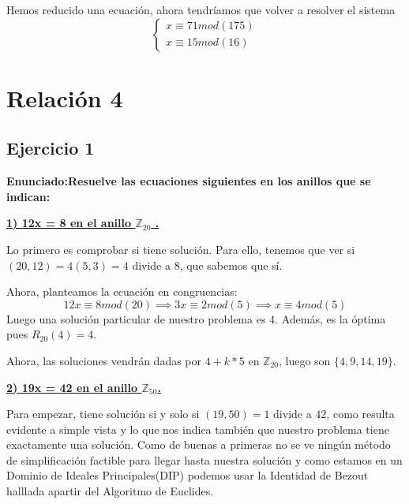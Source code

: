 \documentclass[11pt, a4paper, titlepage]{article}
\providecommand{\ent}{\mathbb{Z}}
\begin{document}
Hemos reducido una ecuación, ahora tendríamos que volver a resolver el sistema
\[
\begin{cases}
	x \equiv 71 mod(175)\\
	x \equiv 15 mod(16)
\end{cases}
\]






\pagebreak
\section{\Huge{Relación 4}}



\subsection{ \LARGE{Ejercicio 1}}

\textbf{Enunciado:Resuelve las ecuaciones siguientes en los anillos que se indican:}

\underline{\textbf{1) 12x = 8 en el anillo $\ent_{20}$ .}}

Lo primero es comprobar si tiene solución. Para ello, tenemos que ver si $(20,12) = 4(5,3) = 4$ divide a 8, que sabemos que sí.

Ahora, planteamos la ecuación en congruencias:
	\[
	12x \equiv 8 mod(20) \implies 3x \equiv 2 mod(5) \implies x \equiv 4 mod(5)
	\]
Luego una solución particular de nuestro problema es 4. Además, es la óptima pues $R_{20}(4) = 4$.

Ahora, las soluciones vendrán dadas por $4+k*5$ en $\ent_{20}$, luego son $\{4,9,14,19\}$.

\underline{\textbf{2) 19x = 42 en el anillo $\ent_{50}$.}}

Para empezar, tiene solución si y solo si $(19,50)=1$ divide a $42$, como resulta evidente a simple vista y lo que nos indica también que nuestro problema tiene exactamente una solución. Como de buenas a primeras no se ve ningún método de simplificación factible para llegar hasta nuestra solución y como estamos en un Dominio de Ideales Principales(DIP) podemos usar la Identidad de Bezout halllada apartir del Algoritmo de Euclides.
\end{document}
